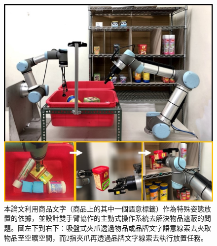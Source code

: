 \begin{figure}[H]
	\centering
	\includegraphics[height=!, width=1.0\linewidth, keepaspectratio=true]
	{./figures/pose-aware-placing-teaser-v3.jpg}
  \caption{本論文利用商品文字（商品上的其中一個語意標籤）作為特殊姿態放置的依據，並設計雙手臂協作的主動式操作系統去解決物品遮蔽的問題。圖左下到右下：吸盤式夾爪透過物品或品牌文字語意線索去夾取物品至空曠空間，而2指夾爪再透過品牌文字線索去執行放置任務。}
  \label{figure:teaser}
\end{figure}
